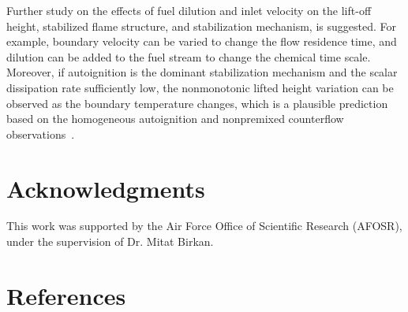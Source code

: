 \documentclass[review,3p,times]{elsarticle}
\begin{document}
Further study on the effects of fuel dilution and inlet velocity on the lift-off height, stabilized flame structure, and stabilization mechanism, is suggested.  For example, boundary velocity can be varied to change the flow residence time, and dilution can be added to the fuel stream to change the chemical time scale.  Moreover, if autoignition is the dominant stabilization mechanism and the scalar dissipation rate sufficiently low, the nonmonotonic lifted height variation can be observed as the boundary temperature changes, which is a plausible prediction based on the homogeneous autoignition and nonpremixed counterflow observations~\cite{deng14}.


\section*{Acknowledgments}
This work was supported by the Air Force Office of Scientific Research (AFOSR), under the supervision of Dr. Mitat Birkan.


\section*{References}



\renewcommand{\thefigure}{\arabic{figure}}
\renewcommand{\thetable}{\arabic{table}}
\end{document}
